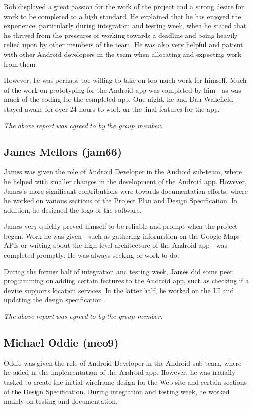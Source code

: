 \documentclass{project}
\begin{document}
Rob displayed a great passion for the work of the project and a strong desire for work to be completed to a high standard. He explained that he has enjoyed the experience; particularly during integration and testing week, when he stated that he thrived from the pressures of working towards a deadline and being heavily relied upon by other members of the team. He was also very helpful and patient with other Android developers in the team when allocating and expecting work from them.

However, he was perhaps too willing to take on too much work for himself. Much of the work on prototyping for the Android app was completed by him - as was much of the coding for the completed app. One night, he and Dan Wakefield stayed awake for over 24 hours to work on the final features for the app.

\emph{The above report was agreed to by the group member.}


\newpage


\subsection{James Mellors (jam66)}
James was given the role of Android Developer in the Android sub-team, where he helped with smaller changes in the development of the Android app. However, James's more significant contributions were towards documentation efforts, where he worked on various sections of the Project Plan and Design Specification. In addition, he designed the logo of the software.

James very quickly proved himself to be reliable and prompt when the project began. Work he was given - such as gathering information on the Google Maps APIs or writing about the high-level architecture of the Android app - was completed promptly. He was always seeking or work to do.

During the former half of integration and testing week, James did some peer programming on adding certain features to the Android app, such as checking if a device supports location services. In the latter half, he worked on the UI and updating the design specification.

\emph{The above report was agreed to by the group member.}


\subsection{Michael Oddie (meo9)}
Oddie was given the role of Android Developer in the Android sub-team, where he aided in the implementation of the Android app. However, he was initially tasked to create the initial wireframe design for the Web site and certain sections of the Design Specification. During integration and testing week, he worked mainly on testing and documentation.
\end{document}
